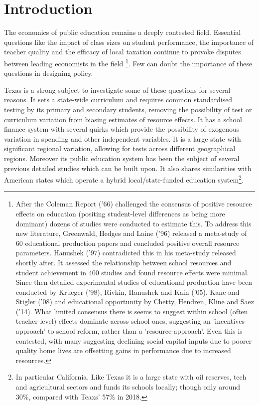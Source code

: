 \documentclass[11pt]{article}
\begin{document}
\setlength{\baselineskip}{0.3in} 

\tableofcontents
\clearpage

\section{Introduction}
\label{s:intro}

The economics of public education remains a deeply contested field. Essential questions like the impact of class sizes on student performance, the importance of teacher quality and the efficacy of local taxation continue to provoke disputes between leading economists in the field \footnote{After the Coleman Report ('66) challenged the consensus of positive resource effects on education (positing student-level differences as being more dominant) dozens of studies were conducted to estimate this. To address this new literature, Greenwald, Hedges and Laine ('96) released a meta-study of 60 educational production papers and concluded positive overall resource parameters. Hanushek ('97) contradicted this in his meta-study released shortly after. It assessed the relationship between school resources and student achievement in 400 studies and found resource effects were minimal. Since then detailed experimental studies of educational production have been conducted by Krueger ('98), Rivkin, Hanushek and Kain ('05), Kane and Stigler ('08) and educational opportunity by Chetty, Hendren, Kline and Saez ('14). What limited consensus there is seems to suggest within school (often teacher-level) effects dominate across school ones, suggesting an 'incentives-approach' to school reform, rather than a 'resource-approach'. Even this is contested, with many suggesting declining social capital inputs due to poorer quality home lives are offsetting gains in performance due to increased resources.}. Few can doubt the importance of these questions in designing policy. 

Texas is a strong subject to investigate some of these questions for several reasons. It sets a state-wide curriculum and requires common standardised testing by its primary and secondary students, removing the possibility of test or curriculum variation from biasing estimates of resource effects. It has a school finance system with several quirks which provide the possibility of exogenous variation in spending and other independent variables. It is a large state with significant regional variation, allowing for tests across different geographical regions. Moreover its public education system has been the subject of several previous detailed studies which can be built upon. It also shares similarities with American states which operate a hybrid local/state-funded education system\footnote{In particular California. Like Texas it is a large state with oil reserves, tech and agricultural sectors and funds its schools locally; though only around 30\%, compared with Teaxs' 57\% in 2018.}.
\end{document}
